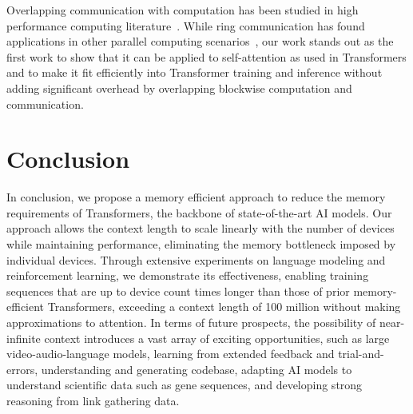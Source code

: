 Overlapping communication with computation has been studied in high performance computing literature~\citep[][\textit{inter alia}]{danalis2005transformations, wang2022overlap, danalis2009mpi}. While ring communication has found applications in other parallel computing scenarios~\citep{bischof2008parallel,hursey2011building,gibiansky2017bringing,sergeev2018horovod}, our work stands out as the first work to show that it can be applied to self-attention as used in Transformers and to make it fit efficiently into Transformer training and inference without adding significant overhead by overlapping blockwise computation and communication.

\section{Conclusion}
In conclusion, we propose a memory efficient approach to reduce the memory requirements of Transformers, the backbone of state-of-the-art AI models. Our approach allows the context length to scale linearly with the number of devices while maintaining performance, eliminating the memory bottleneck imposed by individual devices. Through extensive experiments on language modeling and reinforcement learning, we demonstrate its effectiveness, enabling training sequences that are up to device count times longer than those of prior memory-efficient Transformers, exceeding a context length of 100 million without making approximations to attention. In terms of future prospects, the possibility of near-infinite context introduces a vast array of exciting opportunities, such as large video-audio-language models, learning from extended feedback and trial-and-errors, understanding and generating codebase, adapting AI models to understand scientific data such as gene sequences, and developing strong reasoning from link gathering data.

\ifanonymous
\else


